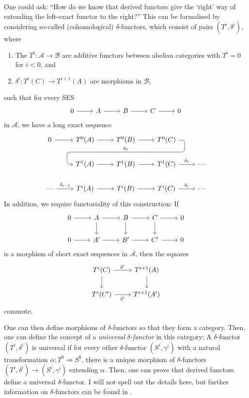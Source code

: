 \begin{bcat}
  One could ask: ``How do we know that derived functors give the `right'
  way of extending the left-exact functor to the right?'' This can be
  formalised by considering so-called (cohomological) $\delta$-functors,
  which consist of pairs $(T^{i},\delta^{i})$, where
  \begin{enumerate}
    \item The $T^{i}:\mathcal{A}\to\mathcal{B}$ are additive functors between
          abelian categories with $T^{i}=0$ for $i<0$, and
    \item $\delta^{i}:T^{i}(C)\to T^{i+1}(A)$ are morphisms in $\mathcal{B}$,
  \end{enumerate}
  such that for every SES
  \[\begin{tikzcd}
      0\rar & A\rar & B\rar & C\rar & 0
    \end{tikzcd}\]
  in $\mathcal{A}$, we have a long exact sequence
  \[\begin{tikzcd}
      0\rar & T^{0}(A)\rar & T^{0}(B)\rar\dar[phantom, ""{coordinate, name=Z}]
      & T^{0}(C)\arrow[rounded corners, to path={[pos=0] --
      ([xshift=2ex]\tikztostart.east) |- (Z) -|
      ([xshift=-2ex]\tikztotarget.west)\tikztonodes -- (\tikztotarget)},
    "\delta_{0}"']{dll} & \\
    & T^{1}(A)\rar & T^{1}(B)\rar & T^{1}(C)\rar{\delta_{1}} & \cdots \\
    \cdots \rar{\delta_{i-1}}& T^{i}(A)\rar & T^{i}(B)\rar
    & T^{i}(C)\rar{\delta_{i}} & \cdots
    \end{tikzcd}\]
  In addition, we require functoriality of this construction: If
  \[\begin{tikzcd}
      0\rar & A\rar\dar & B\rar\dar & C\rar\dar & 0 \\
      0\rar & A^{\prime}\rar & B^{\prime}\rar & C^{\prime}\rar & 0
    \end{tikzcd}\]
  is a morphism of short exact sequences in $\mathcal{A}$, then the
  squares
  \[\begin{tikzcd}
      T^{i}(C)\rar{\delta^{i}}\dar & T^{i+1}(A)\dar \\
      T^{i}(C^{\prime})\arrow["\delta^{i}"']{r} & T^{i+1}(A^{\prime})
    \end{tikzcd}\]
  commute.

  One can then define morphisms of $\delta$-functors so that they form
  a category. Then, one can define the concept of a \emph{universal}
  $\delta$\emph{-functor} in this category: A $\delta$-functor
  $(T^{i},\delta^{i})$ is universal if for every other $\delta$-functor
  $(S^{i},\gamma^{i})$ with a natural transformation
  $\alpha: T^{0}\Rightarrow S^{0}$, there is a unique morphism of
  $\delta$-functors $(T^{i},\delta^{i})\to (S^{i},\gamma^{i})$ extending
  $\alpha$. Then, one can prove that derived functors define a universal
  $\delta$-functor. I will not spell out the details here, but further
  information on $\delta$-functors can be found in \cite{vakil}.
\end{bcat}
